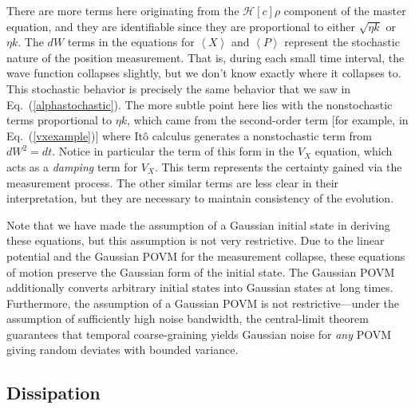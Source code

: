 \documentclass[aps,twocolumn,superscriptaddress,footinbib,floatfix,showpacs]{revtex4}
\def\expct#1{\!\left\langle{#1}\right\rangle}
\def\Vx{V_X}
\begin{document}
There are more terms here originating from the $\mathcal{H}[c]\rho$ component
of the master equation, and they are identifiable since they
are proportional to either $\sqrt{\eta k}$ or $\eta k$.  
The $dW$ terms in the equations for $\expct{X}$ and $\expct{P}$ represent
the stochastic nature of the position measurement.  That is, during each
small time interval, the wave function collapses slightly, but we don't know 
exactly where it collapses to.  This stochastic behavior is
precisely the same behavior that we saw in Eq.~(\ref{alphastochastic}).
The more subtle point here lies with the nonstochastic terms proportional
to $\eta k$, which came from the second-order term [for example,
in Eq.~(\ref{vxexample})] where It\^o calculus generates a 
nonstochastic term from $dW^2=dt$.  Notice in particular the term of
this form in the $\Vx$ equation, which acts as a \textit{damping} term
for $\Vx$.  This term represents the certainty gained via the measurement
process.  The other similar terms are less clear in their interpretation,
but they are necessary to maintain consistency
of the evolution.

Note that we have made the assumption of a Gaussian initial state
in deriving these equations, but this assumption is not very restrictive.
Due to the linear potential and the Gaussian POVM for the measurement
collapse, these equations of motion preserve the Gaussian form of the initial
state.  The Gaussian POVM additionally converts arbitrary initial states into 
Gaussian states at long times.
Furthermore, the assumption of a Gaussian POVM is not 
restrictive---under the assumption of sufficiently high noise bandwidth,
the central-limit theorem guarantees that temporal
coarse-graining yields Gaussian noise for \textit{any} 
POVM giving random deviates with bounded variance.



\subsection{Dissipation}
\end{document}

